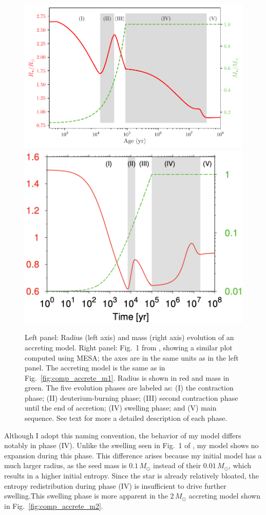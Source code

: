 \documentclass[12pt,a4paper]{article}
\begin{document}
\begin{figure}
  \centering
  \includegraphics[width=.55\textwidth,keepaspectratio]{acce5_mp1m1_acc.pdf}
  \includegraphics[width=.44\textwidth,keepaspectratio]{KunitomoEtAl2017_fig1.png}
  \caption{Left panel: Radius (left axis) and mass (right axis) evolution of an accreting model. Right panel: Fig.~1 from \textcite{KunitomoEtAl2017}, showing a similar plot computed using MESA; the axes are in the same units as in the left panel. The accreting model is the same as in Fig.~\ref{fig:comp_accrete_m1}. Radius is shown in red and mass in green. The five evolution phases are labeled as: (I) the contraction phase; (II) deuterium-burning phase; (III) second contraction phase until the end of accretion; (IV) swelling phase; and (V) main sequence. See text for more a detailed description of each phase.}
  \label{fig:mass_radius_evol}
\end{figure}

Although I adopt this naming convention, the behavior of my model differs notably in phase (IV). Unlike the swelling seen in Fig.~1 of \textcite{KunitomoEtAl2017}, my model shows no expansion during this phase. This difference arises because my initial model has a much larger radius, as the seed mass is $0.1\,M_\odot$ instead of their $0.01\,M_\odot$, which results in a higher initial entropy. Since the star is already relatively bloated, the entropy redistribution during phase (IV) is insufficient to drive further swelling.This swelling phase is more apparent in the $2\,M_\odot$ accreting model shown in Fig.~\ref{fig:comp_accrete_m2}.
\end{document}
